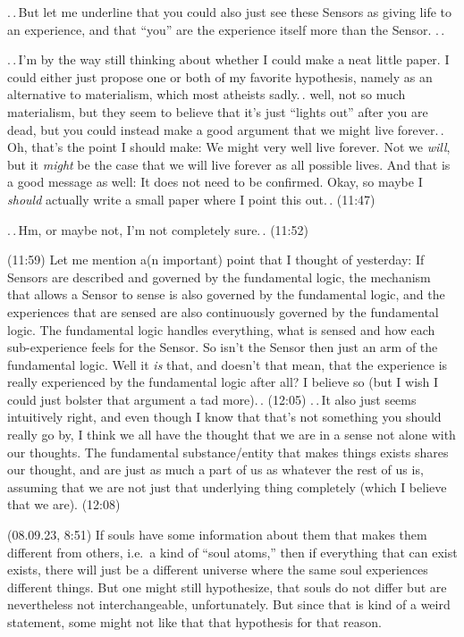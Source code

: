 \documentclass{report}
\begin{document}
.\,.\,But let me underline that you could also just see these Sensors as giving life to an experience, and that ``you'' are the experience itself more than the Sensor. .\,.

.\,.\,I'm by the way still thinking about whether I could make a neat little paper. I could either just propose one or both of my favorite hypothesis, namely as an alternative to materialism, which most atheists sadly.\,. well, not so much materialism, but they seem to believe that it's just ``lights out'' after you are dead, but you could instead make a good argument that we might live forever.\,. Oh, that's the point I should make: We might very well live forever. Not we \emph{will}, but it \emph{might} be the case that we will live forever as all possible lives. And that is a good message as well: It does not need to be confirmed. Okay, so maybe I \emph{should} actually write a small paper where I point this out.\,. (11:47)

.\,.\,Hm, or maybe not, I'm not completely sure.\,. (11:52)

(11:59) Let me mention a(n important) point that I thought of yesterday: If Sensors are described and governed by the fundamental logic, the mechanism that allows a Sensor to sense is also governed by the fundamental logic, and the experiences that are sensed are also continuously governed by the fundamental logic. The fundamental logic handles everything, what is sensed and how each sub-experience feels for the Sensor. So isn't the Sensor then just an arm of the fundamental logic. Well it \emph{is} that, and doesn't that mean, that the experience is really experienced by the fundamental logic after all? I believe so (but I wish I could just bolster that argument a tad more).\,. (12:05) .\,.\,It also just seems intuitively right, and even though I know that that's not something you should really go by, I think we all have the thought that we are in a sense not alone with our thoughts. The fundamental substance/entity that makes things exists shares our thought, and are just as much a part of us as whatever the rest of us is, assuming that we are not just that underlying thing completely (which I believe that we are). (12:08)


(08.09.23, 8:51) If souls have some information about them that makes them different from others, i.e.\ a kind of ``soul atoms,'' then if everything that can exist exists, there will just be a different universe where the same soul experiences different things. But one might still hypothesize, that souls do not differ but are nevertheless not interchangeable, unfortunately. But since that is kind of a weird statement, some might not like that that hypothesis for that reason.
\end{document}
